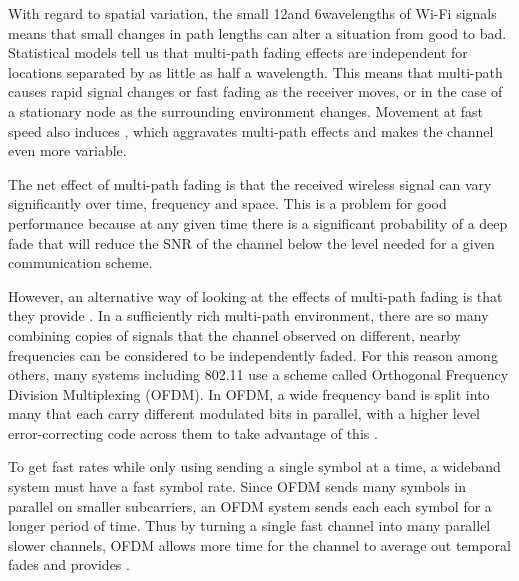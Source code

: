 With regard to spatial variation, the small 12\cm and 6\cm wavelengths of Wi-Fi signals means that small changes in path lengths can alter a situation from good to bad. Statistical models tell us that multi-path fading effects are independent for locations separated by as little as half a wavelength. This means that multi-path causes rapid signal changes or fast fading as the receiver moves, or in the case of a stationary node as the surrounding environment changes.  Movement at fast speed also induces , which aggravates multi-path effects and makes the channel even more variable.

The net effect of multi-path fading is that the received wireless signal can vary significantly over time, frequency and space. This is a problem for good performance because at any given time there is a significant probability of a deep fade that will reduce the SNR of the channel below the level needed for a given communication scheme.

However, an alternative way of looking at the effects of multi-path fading is that they provide . In a sufficiently rich multi-path environment, there are so many combining copies of signals that the channel observed on different, nearby frequencies can be considered to be independently faded. For this reason among others, many systems including 802.11 use a scheme called Orthogonal Frequency Division Multiplexing (OFDM). In OFDM, a wide frequency band is split into many  that each carry different modulated bits in parallel, with a higher level error-correcting code across them to take advantage of this .

To get fast rates while only using sending a single symbol at a time, a wideband system must have a fast symbol rate. Since OFDM sends many symbols in parallel on smaller subcarriers, an OFDM system sends each each symbol for a longer period of time. Thus by turning a single fast channel into many parallel slower channels, OFDM allows more time for the channel to average out temporal fades and provides .

